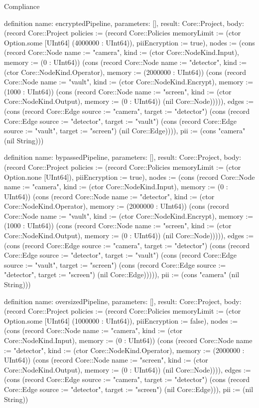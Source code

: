 \begin{lexlean}{Compliance}
\begin{semanticmodule}
definition{
  name: encryptedPipeline,
  parameters: [],
  result: Core::Project,
  body: (record Core::Project {policies := (record Core::Policies {memoryLimit := (ctor Option.some [UInt64] (4000000 : UInt64)), piiEncryption := true}), nodes := (cons (record Core::Node {name := "camera", kind := (ctor Core::NodeKind.Input), memory := (0 : UInt64)}) (cons (record Core::Node {name := "detector", kind := (ctor Core::NodeKind.Operator), memory := (2000000 : UInt64)}) (cons (record Core::Node {name := "vault", kind := (ctor Core::NodeKind.Encrypt), memory := (1000 : UInt64)}) (cons (record Core::Node {name := "screen", kind := (ctor Core::NodeKind.Output), memory := (0 : UInt64)}) (nil Core::Node))))), edges := (cons (record Core::Edge {source := "camera", target := "detector"}) (cons (record Core::Edge {source := "detector", target := "vault"}) (cons (record Core::Edge {source := "vault", target := "screen"}) (nil Core::Edge)))), pii := (cons "camera" (nil String))})
}

definition{
  name: bypassedPipeline,
  parameters: [],
  result: Core::Project,
  body: (record Core::Project {policies := (record Core::Policies {memoryLimit := (ctor Option.none [UInt64]), piiEncryption := true}), nodes := (cons (record Core::Node {name := "camera", kind := (ctor Core::NodeKind.Input), memory := (0 : UInt64)}) (cons (record Core::Node {name := "detector", kind := (ctor Core::NodeKind.Operator), memory := (2000000 : UInt64)}) (cons (record Core::Node {name := "vault", kind := (ctor Core::NodeKind.Encrypt), memory := (1000 : UInt64)}) (cons (record Core::Node {name := "screen", kind := (ctor Core::NodeKind.Output), memory := (0 : UInt64)}) (nil Core::Node))))), edges := (cons (record Core::Edge {source := "camera", target := "detector"}) (cons (record Core::Edge {source := "detector", target := "vault"}) (cons (record Core::Edge {source := "vault", target := "screen"}) (cons (record Core::Edge {source := "detector", target := "screen"}) (nil Core::Edge))))), pii := (cons "camera" (nil String))})
}

definition{
  name: oversizedPipeline,
  parameters: [],
  result: Core::Project,
  body: (record Core::Project {policies := (record Core::Policies {memoryLimit := (ctor Option.some [UInt64] (1000000 : UInt64)), piiEncryption := false}), nodes := (cons (record Core::Node {name := "camera", kind := (ctor Core::NodeKind.Input), memory := (0 : UInt64)}) (cons (record Core::Node {name := "detector", kind := (ctor Core::NodeKind.Operator), memory := (2000000 : UInt64)}) (cons (record Core::Node {name := "screen", kind := (ctor Core::NodeKind.Output), memory := (0 : UInt64)}) (nil Core::Node)))), edges := (cons (record Core::Edge {source := "camera", target := "detector"}) (cons (record Core::Edge {source := "detector", target := "screen"}) (nil Core::Edge))), pii := (nil String)})
}


\end{semanticmodule}
\end{lexlean}
